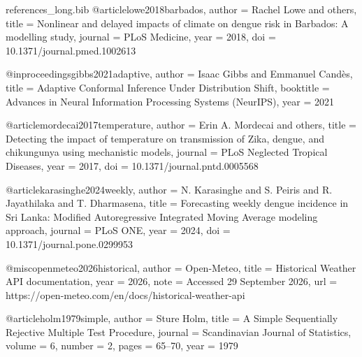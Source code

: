 \begin{filecontents*}[overwrite]{references_long.bib}
@article{lowe2018barbados,
  author  = {Rachel Lowe and others},
  title   = {Nonlinear and delayed impacts of climate on dengue risk in {Barbados}: A modelling study},
  journal = {PLoS Medicine},
  year    = {2018},
  doi     = {10.1371/journal.pmed.1002613}
}

@inproceedings{gibbs2021adaptive,
  author    = {Isaac Gibbs and Emmanuel Cand{\`e}s},
  title     = {Adaptive Conformal Inference Under Distribution Shift},
  booktitle = {Advances in Neural Information Processing Systems (NeurIPS)},
  year      = {2021}
}

@article{mordecai2017temperature,
  author  = {Erin A. Mordecai and others},
  title   = {Detecting the impact of temperature on transmission of {Zika}, dengue, and chikungunya using mechanistic models},
  journal = {PLoS Neglected Tropical Diseases},
  year    = {2017},
  doi     = {10.1371/journal.pntd.0005568}
}

@article{karasinghe2024weekly,
  author  = {N. Karasinghe and S. Peiris and R. Jayathilaka and T. Dharmasena},
  title   = {Forecasting weekly dengue incidence in {Sri Lanka}: Modified Autoregressive Integrated Moving Average modeling approach},
  journal = {PLoS ONE},
  year    = {2024},
  doi     = {10.1371/journal.pone.0299953}
}

@misc{openmeteo2026historical,
  author = {{Open-Meteo}},
  title  = {Historical Weather {API} documentation},
  year   = {2026},
  note   = {Accessed 29 September 2026},
  url    = {https://open-meteo.com/en/docs/historical-weather-api}
}

@article{holm1979simple,
  author  = {Sture Holm},
  title   = {A Simple Sequentially Rejective Multiple Test Procedure},
  journal = {Scandinavian Journal of Statistics},
  volume  = {6},
  number  = {2},
  pages   = {65--70},
  year    = {1979}
}
\end{filecontents*}
\documentclass[sigconf,nonacm]{acmart}


\usepackage{hyperref}
\usepackage{graphicx}
\usepackage{booktabs}
\usepackage{tikz}
\usetikzlibrary{positioning,arrows.meta}

\graphicspath{{images/}{../figures/}{figures/}{./}}

\setlength{\textfloatsep}{6pt plus 2pt minus 2pt}
\setlength{\intextsep}{6pt plus 2pt minus 2pt}
\renewcommand\footnotetextcopyrightpermission[1]{}
\pagestyle{plain}
\setlength{\emergencystretch}{1.5em}



